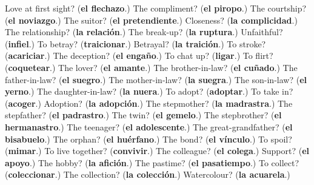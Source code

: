 \begin{tcolorbox}[breakable,colback=teal!4,colframe=teal!35!black,title={Before you move on}]
Love at first sight? (\textbf{el flechazo}.) The compliment? (\textbf{el piropo}.) The courtship? (\textbf{el noviazgo}.) The suitor? (\textbf{el pretendiente}.) Closeness? (\textbf{la complicidad}.) The relationship? (\textbf{la relación}.) The break-up? (\textbf{la ruptura}.) Unfaithful? (\textbf{infiel}.) To betray? (\textbf{traicionar}.) Betrayal? (\textbf{la traición}.) To stroke? (\textbf{acariciar}.) The deception? (\textbf{el engaño}.) To chat up? (\textbf{ligar}.) To flirt? (\textbf{coquetear}.) The lover? (\textbf{el amante}.) The brother-in-law? (\textbf{el cuñado}.) The father-in-law? (\textbf{el suegro}.) The mother-in-law? (\textbf{la suegra}.) The son-in-law? (\textbf{el yerno}.) The daughter-in-law? (\textbf{la nuera}.) To adopt? (\textbf{adoptar}.) To take in? (\textbf{acoger}.) Adoption? (\textbf{la adopción}.) The stepmother? (\textbf{la madrastra}.) The stepfather? (\textbf{el padrastro}.) The twin? (\textbf{el gemelo}.) The stepbrother? (\textbf{el hermanastro}.) The teenager? (\textbf{el adolescente}.) The great-grandfather? (\textbf{el bisabuelo}.) The orphan? (\textbf{el huérfano}.) The bond? (\textbf{el vínculo}.) To spoil? (\textbf{mimar}.) To live together? (\textbf{convivir}.) The colleague? (\textbf{el colega}.) Support? (\textbf{el apoyo}.) The hobby? (\textbf{la afición}.) The pastime? (\textbf{el pasatiempo}.) To collect? (\textbf{coleccionar}.) The collection? (\textbf{la colección}.) Watercolour? (\textbf{la acuarela}.)
\end{tcolorbox}
